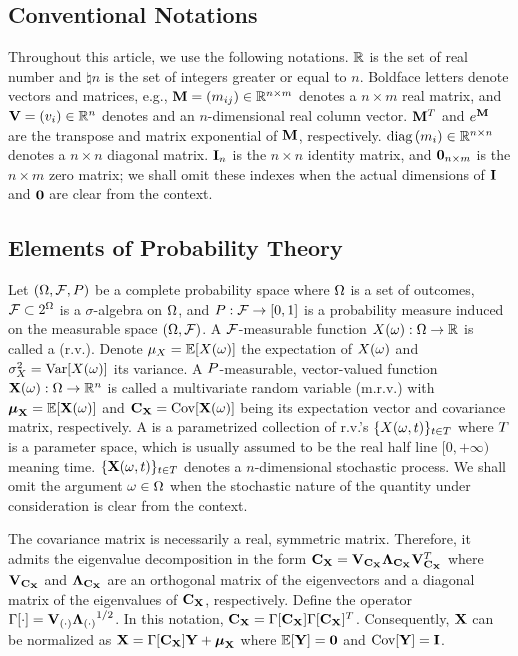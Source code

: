 \subsection{Conventional Notations}
Throughout this article, we use the following notations. $\mathbb{R}$ is the set of real number and $\natural{n}$ is the set of integers greater or equal to $n$. Boldface letters denote vectors and matrices, e.g., $\m{M} = \mtx{m_{ij}} \in \real^{n \times m}$ denotes a $n \times m$ real matrix, and $\mathbf{V} = (v_i) \in \mathbb{R}^n$ denotes and an $n$-dimensional real column vector. $\m{M}^T$ and $e^\m{M}$ are the transpose and matrix exponential of $\m{M}$, respectively. $\text{diag}\left(m_i\right) \in \mathbb{R}^{n \times n}$ denotes a $n \times n$ diagonal matrix. $\mI_n$ is the $n \times n$ identity matrix, and $\mZ_{n \times m}$ is the $n \times m$ zero matrix; we shall omit these indexes when the actual dimensions of $\mI$ and $\mZ$ are clear from the context.

\subsection{Elements of Probability Theory}
Let $(\Omega, \mathcal{F}, P)$ be a complete probability space \cite{durrett2010} where $\Omega$ is a set of outcomes, $\mathcal{F} \subset 2^\Omega$ is a $\sigma$-algebra on $\Omega$, and $P: \mathcal{F} \to [0, 1]$ is a probability measure induced on the measurable space $(\Omega, \mathcal{F})$. A $\mathcal{F}$-measurable function $\rv{x}(\o): \outcomes \to \real$ is called a  (r.v.). Denote $\exp_\rv{x} = \oExp{\rv{x}(\o)}$ the expectation of $\rv{x}(\o)$ and $\var_\rv{x} = \oVar{\rv{x}(\o)}$ its variance. A $P$-measurable, vector-valued function $\mrv{x}(\o): \outcomes \to \real^n$ is called a multivariate random variable (m.r.v.) with $\vExp_\mrv{x} = \oExp{\mrv{x}(\o)}$ and $\mCov_\mrv{x} = \oCov{\mrv{x}(\o)}$ being its expectation vector and covariance matrix, respectively. A  is a parametrized collection of r.v.'s $\{ \rv{x}(\o, \t) \}_{\t \in \sTime}$ where $T$ is a parameter space, which is usually assumed to be the real half line $[0, +\infty)$ meaning time. $\{ \mrv{x}(\o, \t) \}_{\t \in \sTime}$ denotes a $n$-dimensional stochastic process. We shall omit the argument $\omega \in \Omega$ when the stochastic nature of the quantity under consideration is clear from the context.

The covariance matrix is necessarily a real, symmetric matrix. Therefore, it admits the eigenvalue decomposition \cite{press2007} in the form $\mCov_\mrv{x} = \m{V}_{\mCov_\mrv{x}} \m{\Lambda}_{\mCov_\mrv{x}} \m{V}_{\mCov_\mrv{x}}^T$ where $\m{V}_{\mCov_\mrv{x}}$ and $\m{\Lambda}_{\mCov_\mrv{x}}$ are an orthogonal matrix of the eigenvectors and a diagonal matrix of the eigenvalues of $\mCov_\mrv{x}$, respectively. Define the operator $\oEigen{\cd} = \m{V}_{(\cd)} {\m{\Lambda}_{(\cd)}}^{1/2}$. In this notation, $\mCov_\mrv{x} = \oEigen{\mCov_\mrv{x}} \oEigen{\mCov_\mrv{x}}^T$. Consequently, $\mrv{x}$ can be normalized as $\mrv{x} = \oEigen{\mCov_\mrv{x}} \mrv{y} + \vExp_\mrv{x}$ where $\oExp{\mrv{y}} = \mZ$ and $\oCov{\mrv{y}} = \mI$.


